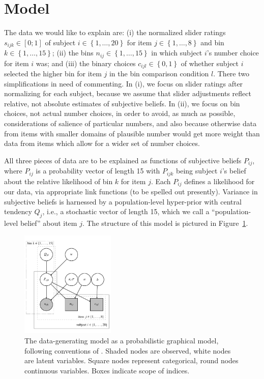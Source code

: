 \documentclass[10pt,letterpaper]{article}
\newcommand{\set}[1]{\left\{#1\right\}}
\newcommand{\citet}[1]{\citeA{#1}}
\begin{document}
\section{Model}

The data we would like to explain are: (i) the normalized slider ratings $s_{ijk} \in [0;1]$ of
subject $i \in \set{1, \dots, 20}$ for item $j \in \set{1, \dots, 8}$ and bin
$k \in \set{1, \dots, 15}$; (ii) the bins $n_{ij} \in \set{1, \dots, 15}$ in which subject
$i$'s number choice for item $i$ was; and (iii) the binary choices $c_{ijl} \in \set{0,1}$ of
whether subject $i$ selected the higher bin for item $j$ in the bin comparison condition
$l$. There two simplifications in need of commenting. In (i), we focus on slider ratings after
normalizing for each subject, because we assume that slider adjustments reflect relative, not
absolute estimates of subjective beliefs. In (ii), we focus on bin choices, not actual number
choices, in order to avoid, as much as possible, considerations of salience of particular
numbers, and also because otherwise data from items with smaller domains of plausible number
would get more weight than data from items which allow for a wider set of number choices.

All three pieces of data are to be explained as functions of subjective beliefs $P_{ij}$, where
$P_{ij}$ is a probability vector of length 15 with $P_{ijk}$ being subject $i$'s belief about
the relative likelihood of bin $k$ for item $j$. Each $P_{ij}$ defines a likelihood for our
data, via appropriate link functions (to be spelled out presently). Variance in subjective
beliefs is harnessed by a population-level hyper-prior with central tendency $Q_{j}$, i.e., a
stochastic vector of length 15, which we call a ``population-level belief'' about item $j$. The
structure of this model is pictured in Figure~\ref{fig:ModelGraph}.

\begin{figure}[]
  \centering
  \includegraphics[width = 0.4\textwidth]{modelGraph/modelGraphNoMath.pdf}
  \caption{The data-generating model as a probabilistic graphical model, following conventions
    of \citet{LeeWagenmakers2013:Bayesian-Cognit}. Shaded nodes are observed, white nodes are
    latent variables. Square nodes represent categorical, round nodes continuous
    variables. Boxes indicate scope of indices.}
  \label{fig:ModelGraph}
\end{figure}
\end{document}
